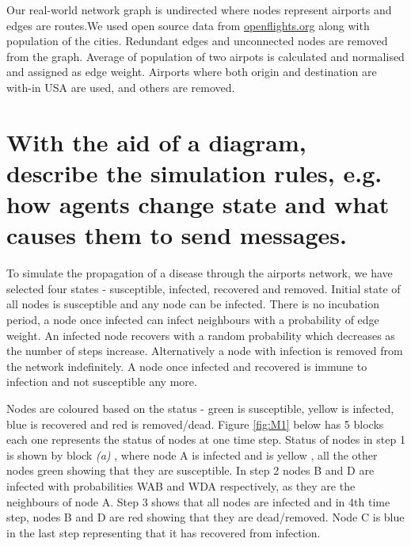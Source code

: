 \documentclass[a4paper,11pt]{article}
\begin{document}
Our real-world network graph is undirected where nodes represent airports and edges are routes.We used open source data from \href{http://openflights.org}{openflights.org} along with population of the cities. Redundant edges and unconnected nodes are removed from the graph. Average of population of two airpots is calculated and normalised and assigned as edge weight. Airports where both origin and destination are with-in USA are used, and others are removed.



\section{With the aid of a diagram, describe the simulation rules, e.g. how agents change state and what causes them to send messages.}



To simulate the propagation of a disease through the airports network, we have selected four states - susceptible, infected, recovered and  removed. Initial state of all nodes is susceptible and any node can be infected. There is no incubation period, a node once infected can infect neighbours with a probability of edge weight. An infected node recovers with a random probability which decreases as the number of steps increase. Alternatively a node with infection is removed from the network indefinitely. A node once infected and recovered is immune to infection and not susceptible any more.

Nodes are coloured based on the status - green is susceptible, yellow is infected, blue is recovered and red is removed/dead. Figure \ref{fig:M1} below has 5 blocks each one represents the status of nodes at one time step. Status of nodes in step 1 is shown by block \textit{(a)} , where node A is infected and is yellow , all the other nodes green showing that they are susceptible. In step 2 nodes B and D are infected with probabilities WAB and WDA respectively, as they are the neighbours of node A. Step 3 shows that all nodes are infected and in 4th time step, nodes B and D are red showing that they are dead/removed. Node C is blue in the last step representing that it has recovered from infection.
\end{document}
